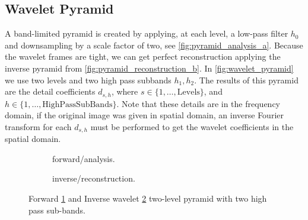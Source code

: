 \subsection{Wavelet Pyramid}
\label{sub:wavelet_pyramid}

A band-limited pyramid is created by applying, at each level, a low-pass filter $h_0$ and downsampling by a scale factor of two, see \autoref{fig:pyramid_analysis_a}. Because the wavelet frames are tight, we can get perfect reconstruction applying the inverse pyramid from \autoref{fig:pyramid_reconstruction_b}. In \autoref{fig:wavelet_pyramid} we use two levels and two high pass subbands $h_1, h_2$. The results of this pyramid are the detail coefficients $d_{s,h}$, where $s \in \{1,\ldots, \text{Levels}\}$, and $h \in \{1,\ldots, \text{HighPassSubBands}\}$. Note that these details are in the frequency domain, if the original image was given in spatial domain, an inverse Fourier transform for each $d_{s,h}$ must be performed to get the wavelet coefficients in the spatial domain.

\begin{figure}[H]
  \begin{subfigure}[t]{\textwidth}
    \centering
    
    \captionsetup{width=0.8\textwidth}
    \caption{forward/analysis.}
    \label{fig:pyramid_analysis_a}
  \end{subfigure}
  \vspace*{\floatsep}
  \begin{subfigure}[t]{\textwidth}
    \centering
    
    \captionsetup{width=0.8\textwidth}
    \caption{inverse/reconstruction.}
    \label{fig:pyramid_reconstruction_b}
  \end{subfigure}
  \caption{Forward \ref{fig:pyramid_analysis_a} and Inverse wavelet \ref{fig:pyramid_reconstruction_b} two-level pyramid with two high pass sub-bands.}
  \label{fig:wavelet_pyramid}
\end{figure}

